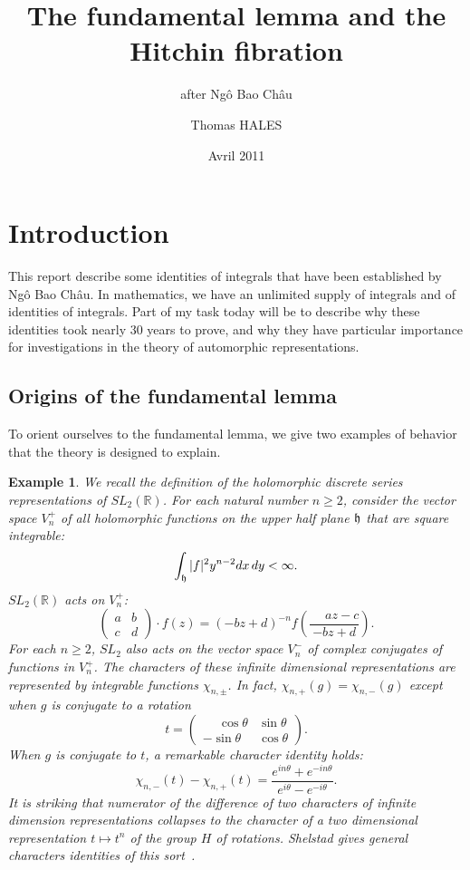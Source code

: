 \documentclass[brochure,english,12pt]{bourbaki}
\date{Avril 2011}
\title{The fundamental lemma and the Hitchin fibration}
\subtitle{after Ng\^o Bao Ch\^au}
\author{Thomas HALES}
\newtheorem{example}[equation]{Example}
\newcommand{\ring}[1]{\mathbb{#1}}
\newcommand{\NBC}{Ng\^o Bao Ch\^au}
\begin{document}
\maketitle

{


}


\section{Introduction}


This report describe some identities of integrals that have
been established by \NBC.  In mathematics, we have an unlimited supply
of integrals and of identities of integrals.  Part of my task today
will be to describe why these identities took nearly 30 years to
prove, and why they have particular importance for investigations in
the theory of automorphic representations.






\subsection{Origins of the fundamental lemma}


To orient ourselves to the fundamental lemma, we give two examples of
behavior that the theory is designed to explain.


\begin{example}  We recall the definition of the holomorphic discrete series representations
of $SL_2(\ring{R})$.  For each natural number $n\ge 2$, consider the vector space $V^+_n$
of all holomorphic functions on the upper half plane ${\frak h}$ that
are square integrable:
\[
\int_{\frak h} |f|^2 y^{n-2} dx\, dy < \infty.
\]
$SL_2(\ring{R})$ acts on $V^+_n$:
\[
\begin{pmatrix} a & b \\ c & d \end{pmatrix} \cdot f(z) = 
(-b z + d ) ^{-n} f (\frac{\phantom{-}a z - c}{-b z + d}).
\]
For each $n\ge 2$, $SL_2$ also acts on the vector space $V^-_n$ of complex
conjugates of functions in $V^+_n$.
The characters of these infinite dimensional representations are represented by integrable functions
$\chi_{n,\pm}$.  In fact, $\chi_{n,+}(g)=\chi_{n,-}(g)$ except when $g$ is conjugate to a rotation
\[
t = \begin{pmatrix} \phantom{-}\cos\theta & \sin\theta \\ -\sin\theta & \cos\theta\end{pmatrix}.
\] 
When $g$ is conjugate to $t$, a remarkable character identity holds:
\[
\chi_{n,-}(t) - \chi_{n,+}(t) = 
\frac{e^{i n \theta} + e^{- i n \theta}}{e^{i\theta}-e^{-i\theta}}.
\]
It is striking that numerator of the difference of two characters of
infinite dimension representations collapses to the character of a two
dimensional representation $t\mapsto t^n$ of the group $H$ of
rotations.  Shelstad gives general characters identities of this
sort~\cite{Sh}.
\end{example}
\end{document}
